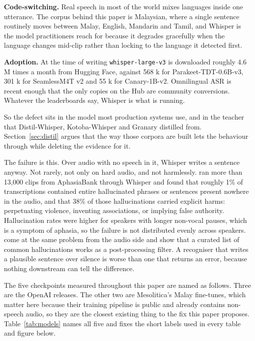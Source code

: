 \documentclass[preprint]{article}
\begin{document}
\textbf{Code-switching.} Real speech in most of the world mixes languages inside one
utterance. The corpus behind this paper is Malaysian, where a single sentence routinely moves
between Malay, English, Mandarin and Tamil, and Whisper is the model practitioners reach for
because it degrades gracefully when the language changes mid-clip rather than locking to the
language it detected first.

\textbf{Adoption.} At the time of writing \texttt{whisper-large-v3} is downloaded roughly
4.6 M times a month from Hugging Face, against 568 k for Parakeet-TDT-0.6B-v3, 301 k for
SeamlessM4T v2 and 55 k for Canary-1B-v2. Omnilingual ASR is recent enough that the only
copies on the Hub are community conversions. Whatever the leaderboards say, Whisper is what is
running.

So the defect sits in the model most production systems use, and in the teacher that
Distil-Whisper, Kotoba-Whisper and Granary distilled from. Section~\ref{sec:distil} argues that the way those corpora are built
lets the behaviour through while deleting the evidence for it.

The failure is this. Over audio with no speech in it, Whisper writes a sentence anyway. Not
rarely, not only on hard audio, and not harmlessly.
\citet{koenecke2024careless} ran more than 13,000 clips from AphasiaBank through Whisper and
found that roughly 1\% of transcriptions contained entire hallucinated phrases or sentences
present nowhere in the audio, and that 38\% of those hallucinations carried explicit harms:
perpetuating violence, inventing associations, or implying false authority. Hallucination rates
were higher for speakers with longer non-vocal pauses, which is a symptom of aphasia, so the
failure is not distributed evenly across speakers.
\citet{baranski2025nonspeech} come at the same problem from the audio side and show that a
curated list of common hallucinations works as a post-processing filter. A recogniser that
writes a plausible sentence over silence is worse than one that returns an error, because
nothing downstream can tell the difference.

The five checkpoints measured throughout this paper are named as follows. Three are the
OpenAI releases. The other two are Mesolitica's Malay fine-tunes, which matter here because
their training pipeline is public and already contains non-speech audio, so they are the
closest existing thing to the fix this paper proposes. Table~\ref{tab:models} names all five
and fixes the short labels used in every table and figure below.
\end{document}
